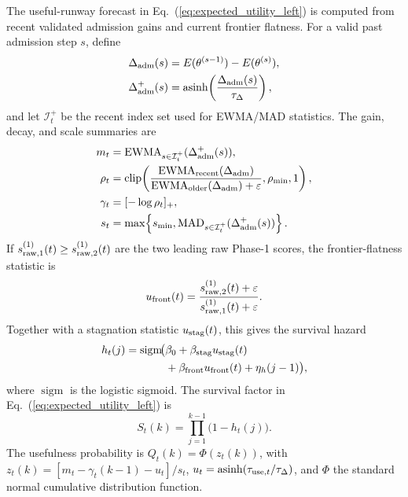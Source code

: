 \documentclass[
  reprint,
  amsmath,
  amssymb,
  aps,
  pra,
  nofootinbib,
  superscriptaddress,
  floatfix
]{revtex4-2}
\newcommand{\eps}{\varepsilon}
\begin{document}
The useful-runway forecast in Eq.~(\ref{eq:expected_utility_left}) is computed from recent validated admission gains and current frontier flatness. For a valid past admission step $s$, define
\begin{equation}
\begin{aligned}
\Delta_{\rm adm}(s)
&=E(\theta^{(s-1)})-E(\theta^{(s)}),\\
\Delta_{\rm adm}^{+}(s)
&=\operatorname{asinh}\!\left(\frac{\Delta_{\rm adm}(s)}{\tau_\Delta}\right),
\end{aligned}
\label{eq:appendix_admission_gain}
\end{equation}
and let $\mathcal I_t^+$ be the recent index set used for EWMA/MAD statistics. The gain, decay, and scale summaries are
\begin{equation}
\begin{aligned}
m_t&=\operatorname{EWMA}_{s\in\mathcal I_t^+}(\Delta_{\rm adm}^{+}(s)),\\
\rho_t&=\operatorname{clip}\!\left(
\frac{\operatorname{EWMA}_{\rm recent}(\Delta_{\rm adm})}
{\operatorname{EWMA}_{\rm older}(\Delta_{\rm adm})+\eps},
\rho_{\min},1\right),\\
\gamma_t&=[-\log\rho_t]_+,\\
s_t&=\max\!\left\{s_{\min},
\operatorname{MAD}_{s\in\mathcal I_t^+}(\Delta_{\rm adm}^{+}(s))\right\}.
\end{aligned}
\label{eq:appendix_runway_stats}
\end{equation}
If $s_{{\rm raw},1}^{(1)}(t)\ge s_{{\rm raw},2}^{(1)}(t)$ are the two leading raw Phase-1 scores, the frontier-flatness statistic is
\begin{equation}
u_{\rm front}(t)=
\frac{s_{{\rm raw},2}^{(1)}(t)+\eps}
{s_{{\rm raw},1}^{(1)}(t)+\eps}.
\label{eq:appendix_frontier_flatness}
\end{equation}
Together with a stagnation statistic $u_{\rm stag}(t)$, this gives the survival hazard
\begin{equation}
\begin{split}
h_t(j)=\operatorname{sigm}\!\bigl(&
\beta_0+\beta_{\rm stag}u_{\rm stag}(t)\\
&+\beta_{\rm front}u_{\rm front}(t)+\eta_h(j-1)
\bigr),
\end{split}
\label{eq:appendix_survival_hazard}
\end{equation}
where $\operatorname{sigm}$ is the logistic sigmoid. The survival factor in Eq.~(\ref{eq:expected_utility_left}) is
\begin{equation}
S_t(k)=\prod_{j=1}^{k-1}\bigl(1-h_t(j)\bigr).
\label{eq:appendix_survival_usefulness}
\end{equation}
The usefulness probability is $Q_t(k)=\Phi(z_t(k))$, with
$z_t(k)=[m_t-\gamma_t(k-1)-u_t]/s_t$,
$u_t=\operatorname{asinh}(\tau_{{\rm use},t}/\tau_\Delta)$, and
$\Phi$ the standard normal cumulative distribution function.
\end{document}
